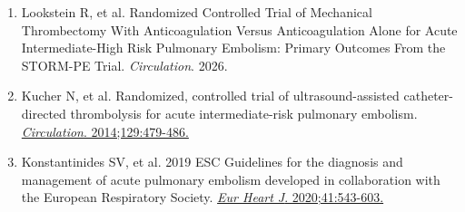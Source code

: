 \documentclass[12pt,a4paper]{article}
\begin{document}
\begin{enumerate}
    \item Lookstein R, et al. Randomized Controlled Trial of Mechanical Thrombectomy With Anticoagulation Versus Anticoagulation Alone for Acute Intermediate-High Risk Pulmonary Embolism: Primary Outcomes From the STORM-PE Trial. \textit{Circulation}. 2026.
    \item Kucher N, et al. Randomized, controlled trial of ultrasound-assisted catheter-directed thrombolysis for acute intermediate-risk pulmonary embolism. \href{https://doi.org/10.1161/CIRCULATIONAHA.113.005544}{\textit{Circulation}. 2014;129:479-486.}
    \item Konstantinides SV, et al. 2019 ESC Guidelines for the diagnosis and management of acute pulmonary embolism developed in collaboration with the European Respiratory Society. \href{https://doi.org/10.1093/eurheartj/ehz405}{\textit{Eur Heart J}. 2020;41:543-603.}
\end{enumerate}
\end{document}
